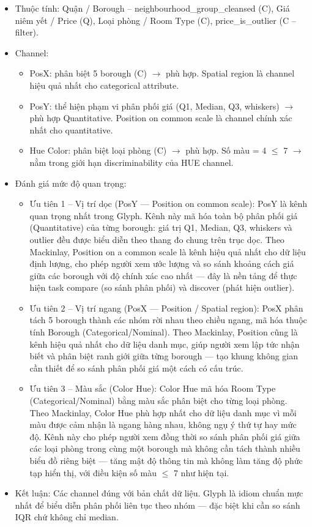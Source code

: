 \begin{itemize}
    \item Thuộc tính: Quận / Borough -- neighbourhood\_group\_cleansed (C), Giá niêm yết / Price (Q), Loại phòng / Room Type (C), price\_is\_outlier (C -- filter).
    \item Channel:
    \begin{itemize}
        \item PosX: phân biệt 5 borough (C) $\rightarrow$ phù hợp. Spatial region là channel hiệu quả nhất cho categorical attribute.
        \item PosY: thể hiện phạm vi phân phối giá (Q1, Median, Q3, whiskers) $\rightarrow$ phù hợp Quantitative. Position on common scale là channel chính xác nhất cho quantitative.
        \item Hue Color: phân biệt loại phòng (C) $\rightarrow$ phù hợp. Số màu = 4 $\leq$ 7 $\rightarrow$ nằm trong giới hạn discriminability của HUE channel.
    \end{itemize}
    \item Đánh giá mức độ quan trọng:
    \begin{itemize}
        \item Ưu tiên 1 -- Vị trí dọc (PosY --- Position on common scale): PosY là kênh quan trọng nhất trong Glyph. Kênh này mã hóa toàn bộ phân phối giá (Quantitative) của từng borough: giá trị Q1, Median, Q3, whiskers và outlier đều được biểu diễn theo thang đo chung trên trục dọc. Theo Mackinlay, Position on a common scale là kênh hiệu quả nhất cho dữ liệu định lượng, cho phép người xem ước lượng và so sánh khoảng cách giá giữa các borough với độ chính xác cao nhất --- đây là nền tảng để thực hiện task compare (so sánh phân phối) và discover (phát hiện outlier).
        \item Ưu tiên 2 -- Vị trí ngang (PosX --- Position / Spatial region): PosX phân tách 5 borough thành các nhóm rời nhau theo chiều ngang, mã hóa thuộc tính Borough (Categorical/Nominal). Theo Mackinlay, Position cũng là kênh hiệu quả nhất cho dữ liệu danh mục, giúp người xem lập tức nhận biết và phân biệt ranh giới giữa từng borough --- tạo khung không gian cần thiết để so sánh phân phối giá một cách có cấu trúc.
        \item Ưu tiên 3 -- Màu sắc (Color Hue): Color Hue mã hóa Room Type (Categorical/Nominal) bằng màu sắc phân biệt cho từng loại phòng. Theo Mackinlay, Color Hue phù hợp nhất cho dữ liệu danh mục vì mỗi màu được cảm nhận là ngang hàng nhau, không ngụ ý thứ tự hay mức độ. Kênh này cho phép người xem đồng thời so sánh phân phối giá giữa các loại phòng trong cùng một borough mà không cần tách thành nhiều biểu đồ riêng biệt --- tăng mật độ thông tin mà không làm tăng độ phức tạp hiển thị, với điều kiện số màu $\leq$ 7 như hiện tại.
    \end{itemize}
    \item Kết luận: Các channel đúng với bản chất dữ liệu. Glyph là idiom chuẩn mực nhất để biểu diễn phân phối liên tục theo nhóm --- đặc biệt khi cần so sánh IQR chứ không chỉ median.
\end{itemize}

